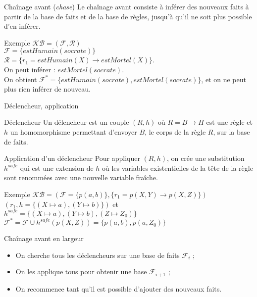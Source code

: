 

\begin{frame}{Chaînage avant (\textit{chase})}
    Le chaînage avant consiste à inférer des nouveaux faits à partir de la base de faits et de la base de règles, jusqu'à qu'il ne soit plus possible d'en inférer.
    \begin{block}{Exemple}
        $\mathcal{KB} = (\mathcal{F}, \mathcal{R})$
        \\ $\mathcal{F} = \{estHumain(socrate)\}$
        \\ $\mathcal{R} = \{r_1 = estHumain(X) \rightarrow estMortel(X)\}$.
        \\ On peut inférer : $estMortel(socrate)$.
        \\ On obtient $\mathcal{F}^* = \{estHumain(socrate), estMortel(socrate)\}$, et on ne peut plus rien inférer de nouveau.
    \end{block}
\end{frame}

\begin{frame}{Déclencheur, application}
    \begin{block}{Déclencheur}
        Un délencheur est un couple $(R,h)$ où $R = B \rightarrow H$ est une règle et $h$ un homomorphisme permettant d'envoyer $B$, le corps de la règle $R$, sur la base de faits.
    \end{block}
    \begin{block}{Application d'un déclencheur}
        Pour appliquer $(R,h)$, on crée une substitution $h^{safe}$ qui est une extension de $h$ où les variables existentielles de la tête de la règle sont renommées avec une nouvelle variable fraîche.
    \end{block}
    \begin{block}{Exemple}
        $\mathcal{KB} = (\mathcal{F} = \{p(a,b)\}, \{r_1 = p(X,Y) \rightarrow p(X,Z)\})$ \\
        $(r_1,h = \{(X \mapsto a), (Y \mapsto b)\})$ et
        $h^{safe} = \{(X \mapsto a), (Y \mapsto b), (Z \mapsto Z_0)\}$ \\
        $\mathcal{F}^* = \mathcal{F} \cup h^{safe}(p(X,Z)) = \{p(a,b),p(a,Z_0)\}$
    \end{block}
\end{frame}

\begin{frame}{Chaînage avant en largeur}
    \begin{itemize}
        \item On cherche tous les déclencheurs sur une base de faits $\mathcal{F}_i$ ;
        \item On les applique tous pour obtenir une base $\mathcal{F}_{i+1}$ ;
        \item On recommence tant qu'il est possible d'ajouter des nouveaux faits.
    \end{itemize}
\end{frame}